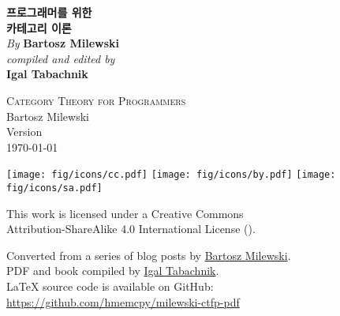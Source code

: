 

\thispagestyle{empty}

\vspace*{80pt}

\begin{raggedleft}
\fontsize{24pt}{24pt}\selectfont
\textbf{프로그래머를 위한 \\ 카테고리 이론}\\
\ifdefined{}
\fi
\vspace*{1cm}
\fontsize{16pt}{18pt}\selectfont \textit{By } \textbf{Bartosz Milewski}\\
\vspace{1cm}
\fontsize{12pt}{14pt}\selectfont \textit{compiled and edited by}\\ \textbf{Igal Tabachnik}\\

\end{raggedleft}


\newpage

\vspace*{0.3\textheight}
\thispagestyle{empty}

\begin{small}
\begin{center}

\textsc{Category Theory for Programmers}\\

\vspace{1.0em}
\noindent
Bartosz Milewski\\

\vspace{1.26em}
\noindent
Version \texttt{\OPTversion}\\\today


\vspace{1.6em}
\noindent
\texttt{[image: fig/icons/cc.pdf]}
\texttt{[image: fig/icons/by.pdf]}
\texttt{[image: fig/icons/sa.pdf]}

\vspace{0.4em}
\noindent
This work is licensed under a Creative Commons\\
Attribution-ShareAlike 4.0 International License
(\href{http://creativecommons.org/licenses/by-sa/4.0/}{}).

\vspace{1.26em}
\noindent
Converted from a series of blog posts by \href{https://bartoszmilewski.com/2014/10/28/category-theory-for-programmers-the-preface/}{Bartosz Milewski}.\\
PDF and book compiled by \href{https://hmemcpy.com}{Igal Tabachnik}.\\
\vspace{1.26em}
\noindent
\LaTeX{} source code is available on GitHub: \href{https://github.com/hmemcpy/milewski-ctfp-pdf}{https://github.com/hmemcpy/milewski-ctfp-pdf} 
\end{center}
\end{small}